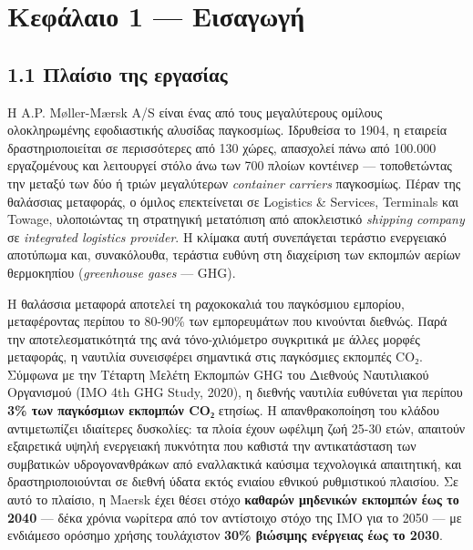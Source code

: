 \pagebreak

\chapter{Κεφάλαιο 1 ---
Εισαγωγή}\label{ux3baux3b5ux3c6ux3acux3bbux3b1ux3b9ux3bf-1-ux3b5ux3b9ux3c3ux3b1ux3b3ux3c9ux3b3ux3ae}

\section{1.1 Πλαίσιο της
εργασίας}\label{ux3c0ux3bbux3b1ux3afux3c3ux3b9ux3bf-ux3c4ux3b7ux3c2-ux3b5ux3c1ux3b3ux3b1ux3c3ux3afux3b1ux3c2}

Η A.P. Møller-Mærsk A/S είναι ένας από τους μεγαλύτερους ομίλους
ολοκληρωμένης εφοδιαστικής αλυσίδας παγκοσμίως. Ιδρυθείσα το 1904, η
εταιρεία δραστηριοποιείται σε περισσότερες από 130 χώρες, απασχολεί πάνω
από 100.000 εργαζομένους και λειτουργεί στόλο άνω των 700 πλοίων
κοντέινερ --- τοποθετώντας την μεταξύ των δύο ή τριών μεγαλύτερων
\emph{container carriers} παγκοσμίως. Πέραν της θαλάσσιας μεταφοράς, ο
όμιλος επεκτείνεται σε Logistics \& Services, Terminals και Towage,
υλοποιώντας τη στρατηγική μετατόπιση από αποκλειστικό \emph{shipping
company} σε \emph{integrated logistics provider}. Η κλίμακα αυτή
συνεπάγεται τεράστιο ενεργειακό αποτύπωμα και, συνακόλουθα, τεράστια
ευθύνη στη διαχείριση των εκπομπών αερίων θερμοκηπίου (\emph{greenhouse
gases} --- GHG).

Η θαλάσσια μεταφορά αποτελεί τη ραχοκοκαλιά του παγκόσμιου εμπορίου,
μεταφέροντας περίπου το 80-90\% των εμπορευμάτων που κινούνται διεθνώς.
Παρά την αποτελεσματικότητά της ανά τόνο-χιλιόμετρο συγκριτικά με άλλες
μορφές μεταφοράς, η ναυτιλία συνεισφέρει σημαντικά στις παγκόσμιες
εκπομπές CO₂. Σύμφωνα με την Τέταρτη Μελέτη Εκπομπών GHG του Διεθνούς
Ναυτιλιακού Οργανισμού (IMO 4th GHG Study, 2020), η διεθνής ναυτιλία
ευθύνεται για περίπου \textbf{3\% των παγκόσμιων εκπομπών CO₂} ετησίως.
Η απανθρακοποίηση του κλάδου αντιμετωπίζει ιδιαίτερες δυσκολίες: τα
πλοία έχουν ωφέλιμη ζωή 25-30 ετών, απαιτούν εξαιρετικά υψηλή ενεργειακή
πυκνότητα που καθιστά την αντικατάσταση των συμβατικών υδρογονανθράκων
από εναλλακτικά καύσιμα τεχνολογικά απαιτητική, και δραστηριοποιούνται
σε διεθνή ύδατα εκτός ενιαίου εθνικού ρυθμιστικού πλαισίου. Σε αυτό το
πλαίσιο, η Maersk έχει θέσει στόχο \textbf{καθαρών μηδενικών εκπομπών
έως το 2040} --- δέκα χρόνια νωρίτερα από τον αντίστοιχο στόχο της IMO
για το 2050 --- με ενδιάμεσο ορόσημο χρήσης τουλάχιστον \textbf{30\%
βιώσιμης ενέργειας έως το 2030}.

